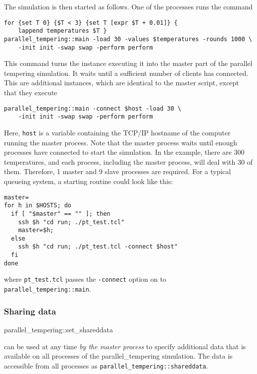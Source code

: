 The simulation is then started as follows. One of the processes runs the command
\begin{verbatim}
for {set T 0} {$T < 3} {set T [expr $T + 0.01]} {
    lappend temperatures $T }
parallel_tempering::main -load 30 -values $temperatures -rounds 1000 \
    -init init -swap swap -perform perform
\end{verbatim}
This command turns the \es{} instance executing it into the master part of the parallel tempering
simulation. It waits until a sufficient number of clients has connected. This are additional \es{}
instances, which are identical to the master script, except that they execute
\begin{verbatim}
parallel_tempering::main -connect $host -load 30 \
    -init init -swap swap -perform perform
\end{verbatim} %
Here, {\tt host} is a variable containing the TCP/IP hostname of the computer running the master
process. Note that the master process waits until enough processes have connected to start the
simulation. In the example, there are 300 temperatures, and each process, including the master
process, will deal with 30 of them. Therefore, 1 master and 9 slave processes are required. For a
typical queueing system, a starting routine could look like this:
\begin{verbatim}
master=
for h in $HOSTS; do
  if [ "$master" == "" ]; then
    ssh $h "cd run; ./pt_test.tcl"
    master=$h;
  else
    ssh $h "cd run; ./pt_test.tcl -connect $host"
  fi
done
\end{verbatim}
where {\tt pt_test.tcl} passes the {\tt -connect} option on to {\tt parallel_tempering::main}.

\subsubsection{Sharing data}

\begin{essyntax}
  parallel_tempering::set_shareddata 
\end{essyntax}

can be used at any time {\em by the master process} to specify additional data that is available on
all processes of the parallel_tempering simulation. The data is accessible from all processes as
{\tt parallel_tempering::shareddata}.

